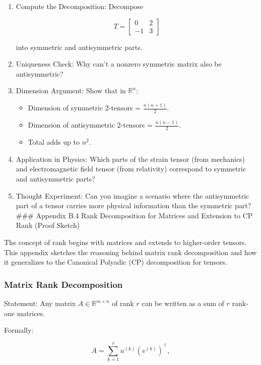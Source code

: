 \documentclass[
  letterpaper,
  DIV=11,
  numbers=noendperiod]{scrreprt}
\providecommand{\tightlist}{%
  \setlength{\itemsep}{0pt}\setlength{\parskip}{0pt}}
\begin{document}
\begin{enumerate}
\def\labelenumi{\arabic{enumi}.}
\item
  Compute the Decomposition: Decompose

  \[
  T = \begin{bmatrix} 0 & 2 \\ -1 & 3 \end{bmatrix}
  \]

  into symmetric and antisymmetric parts.
\item
  Uniqueness Check: Why can't a nonzero symmetric matrix also be
  antisymmetric?
\item
  Dimension Argument: Show that in \(\mathbb{R}^n\):

  \begin{itemize}
  \tightlist
  \item
    Dimension of symmetric 2-tensors = \(\tfrac{n(n+1)}{2}\).
  \item
    Dimension of antisymmetric 2-tensors = \(\tfrac{n(n-1)}{2}\).
  \item
    Total adds up to \(n^2\).
  \end{itemize}
\item
  Application in Physics: Which parts of the strain tensor (from
  mechanics) and electromagnetic field tensor (from relativity)
  correspond to symmetric and antisymmetric parts?
\item
  Thought Experiment: Can you imagine a scenario where the antisymmetric
  part of a tensor carries more physical information than the symmetric
  part? \#\#\# Appendix B.4 Rank Decomposition for Matrices and
  Extension to CP Rank (Proof Sketch)
\end{enumerate}

The concept of rank begins with matrices and extends to higher-order
tensors. This appendix sketches the reasoning behind matrix rank
decomposition and how it generalizes to the Canonical Polyadic (CP)
decomposition for tensors.

\subsubsection{Matrix Rank
Decomposition}\label{matrix-rank-decomposition}

Statement: Any matrix \(A \in \mathbb{R}^{m \times n}\) of rank \(r\)
can be written as a sum of \(r\) rank-one matrices.

Formally:

\[
A = \sum_{k=1}^r u^{(k)} (v^{(k)})^\top,
\]
\end{document}
